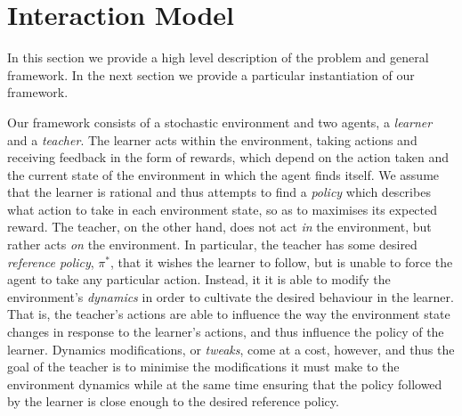 

\section{Interaction Model}\label{sec: GeneralModel}

In this section we provide a high level description of the problem and
general framework.  In the next section we provide a particular
instantiation of our framework.

Our framework consists of a stochastic environment and two agents, a
\emph{learner} and a \emph{teacher}.  The learner acts within the
environment, taking actions and receiving feedback in the form of
rewards, which depend on the action taken and the current state of the
environment in which the agent finds itself.  We assume that the
learner is rational and thus attempts to find a \emph{policy} which
describes what action to take in each environment state, so as to
maximises its expected reward.  The teacher, on the other hand, does
not act \emph{in} the environment, but rather acts \emph{on} the
environment.  In particular, the teacher has some desired
\emph{reference policy}, $\pi^*$, that it wishes the learner to
follow, but is unable to force the agent to take any particular
action.  Instead, it  it is able to modify the environment's
\emph{dynamics} in order to cultivate the desired behaviour in the learner.  That is, the teacher's actions are able to influence the way
the environment state changes in response to the learner's actions,
and thus influence the policy of the learner. Dynamics modifications, or \emph{tweaks}, 
come at a cost, however, and thus the goal of the teacher is to
minimise the modifications it must make to the environment dynamics
while at the same time ensuring that the policy followed by the
learner is close enough to the desired reference policy.

